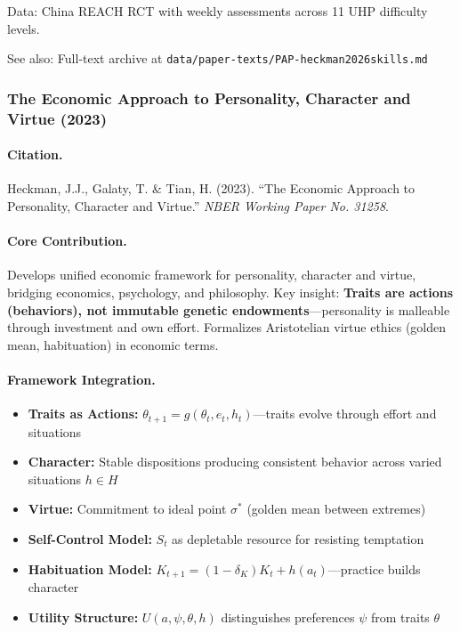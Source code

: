 Data: China REACH RCT with weekly assessments across 11 UHP difficulty levels.

See also: Full-text archive at \texttt{data/paper-texts/PAP-heckman2026skills.md}

\subsubsection{The Economic Approach to Personality, Character and Virtue (2023)}

\paragraph{Citation.}
Heckman, J.J., Galaty, T. \& Tian, H. (2023). ``The Economic Approach to Personality,
Character and Virtue.'' \emph{NBER Working Paper No. 31258}.
\citep{PAP-heckman2023virtue}

\paragraph{Core Contribution.}
Develops unified economic framework for personality, character and virtue, bridging
economics, psychology, and philosophy. Key insight: \textbf{Traits are actions (behaviors),
not immutable genetic endowments}---personality is malleable through investment and own
effort. Formalizes Aristotelian virtue ethics (golden mean, habituation) in economic terms.

\paragraph{Framework Integration.}
\begin{itemize}
  \item \textbf{Traits as Actions:} $\theta_{t+1} = g(\theta_t, e_t, h_t)$---traits evolve
        through effort and situations
  \item \textbf{Character:} Stable dispositions producing consistent behavior across
        varied situations $h \in H$
  \item \textbf{Virtue:} Commitment to ideal point $\sigma^*$ (golden mean between extremes)
  \item \textbf{Self-Control Model:} $S_t$ as depletable resource for resisting temptation
  \item \textbf{Habituation Model:} $K_{t+1} = (1-\delta_K)K_t + h(a_t)$---practice builds
        character
  \item \textbf{Utility Structure:} $U(a, \psi, \theta, h)$ distinguishes preferences
        $\psi$ from traits $\theta$
\end{itemize}

